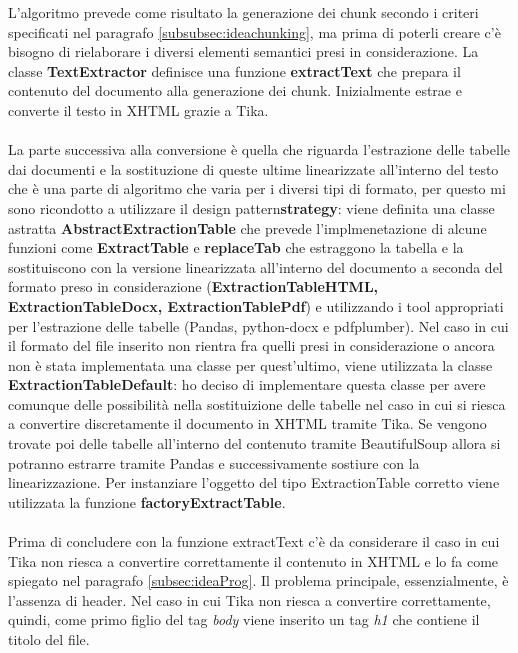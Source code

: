 \noindent L'algoritmo prevede come risultato la generazione dei chunk secondo i criteri specificati nel paragrafo \ref{subsubsec:ideachunking}, ma prima di poterli creare c'è bisogno di rielaborare i diversi elementi semantici presi in considerazione.
La classe \textbf{TextExtractor} definisce una funzione \textbf{extractText} che prepara il contenuto del documento alla generazione dei chunk. Inizialmente estrae e converte il testo in XHTML grazie a Tika.
\\\\La parte successiva alla conversione è quella che riguarda l'estrazione delle tabelle dai documenti e la sostituzione di queste ultime linearizzate all'interno del testo che è una parte di algoritmo che varia per i diversi tipi di formato, per questo mi sono ricondotto a utilizzare 
il \gls{design pattern}\glsfirstoccur \textbf{\gls{strategy}}\glsfirstoccur: viene definita una classe astratta \textbf{AbstractExtractionTable} che prevede l'implmenetazione di alcune funzioni come \textbf{ExtractTable} e \textbf{replaceTab} che estraggono la tabella e la sostituiscono con la versione linearizzata all'interno del documento
a seconda del formato preso in considerazione (\textbf{ExtractionTableHTML, ExtractionTableDocx, ExtractionTablePdf}) e utilizzando i tool appropriati per l'estrazione delle tabelle (Pandas, python-docx e pdfplumber).
Nel caso in cui il formato del file inserito non rientra fra quelli presi in considerazione o ancora non è stata implementata una classe per quest'ultimo, viene utilizzata la classe \textbf{ExtractionTableDefault}: ho deciso di implementare questa classe per avere comunque delle possibilità nella sostituizione delle tabelle nel caso in cui si riesca a convertire discretamente il documento in XHTML tramite Tika.
Se vengono trovate poi delle tabelle all'interno del contenuto tramite BeautifulSoup allora si potranno estrarre tramite Pandas e successivamente sostiure con la linearizzazione.
Per instanziare l'oggetto del tipo ExtractionTable corretto viene utilizzata la funzione \textbf{factoryExtractTable}. 
\\\\Prima di concludere con la funzione extractText c'è da considerare il caso in cui Tika non riesca a convertire correttamente il contenuto in XHTML e lo fa come spiegato nel paragrafo \ref{subsec:ideaProg}. Il problema principale, essenzialmente, è l'assenza di header.
Nel caso in cui Tika non riesca a convertire correttamente, quindi, come primo figlio del tag \emph{body} viene inserito un tag \emph{h1} che contiene il titolo del file.
